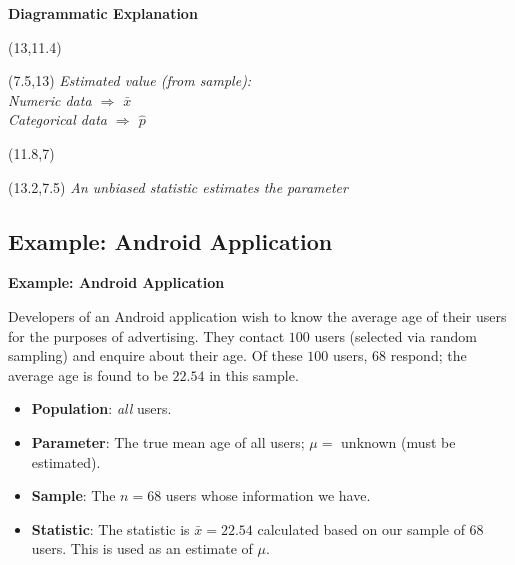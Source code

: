 \documentclass[compress]{beamer}        %
\makeatletter
\newcommand{\tcb}{\textcolor{beamer@blendedblue}}
\makeatother
\begin{document}
\begin{frame}{\bf \tcb{Diagrammatic Explanation}}
\begin{textblock}{1}(13,11.4)
\xymatrixrowsep{1.2cm}
\end{textblock}
\begin{textblock}{6}(7.5,13)
{\footnotesize\emph{Estimated value (from sample):\\
Numeric data $\Rightarrow$ $\bar x$\\
Categorical data $\Rightarrow$ $\hat p$}}
\end{textblock}

\begin{textblock}{1}(11.8,7)
\xymatrixcolsep{0.7cm}
\end{textblock}
\begin{textblock}{3}(13.2,7.5)
{\footnotesize\emph{An unbiased statistic estimates the parameter}}
\end{textblock}
\end{frame}


\subsection{Example: Android Application}
\begin{frame}{\bf \tcb{Example: Android Application\\[-0.9cm]}}

Developers of an Android application wish to know the average age of their users for the purposes of advertising. They contact $100$ users (selected via random sampling) and enquire about their age. Of these $100$ users, $68$ respond; the average age is found to be $22.54$ in this sample.\\[0.2cm]

\begin{itemize}\itemsep0.4cm
\item {\bf Population}: \emph{all} users.
\item {\bf Parameter}: The true mean age of all users; $\mu =$ unknown (must be estimated).
\item {\bf Sample}: The $n = 68$ users whose information we have.
\item {\bf Statistic}: The statistic is $\bar x = 22.54$ calculated based on our sample of $68$ users. This is used as an estimate of $\mu$.
\end{itemize}

\end{frame}
\end{document}
